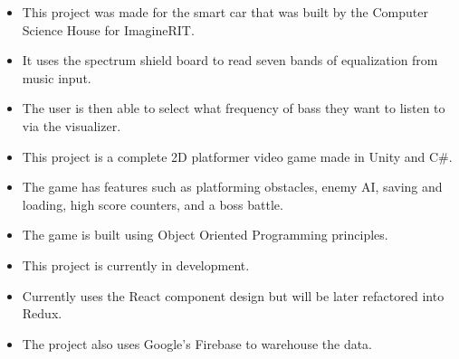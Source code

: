 \documentclass[10pt,a4paper,ragged2e]{altacv}
\begin{document}
\bigskip

\begin{itemize}
\item This project was made for the smart car that was built by the Computer Science House for ImagineRIT.
\item It uses the spectrum shield board to read seven bands of equalization from music input.
\item The user is then able to select what frequency of bass they want to listen to via the visualizer.
\end{itemize}
\divider

\begin{itemize}
\item This project is a complete 2D platformer video game made in Unity and C\#.
\item The game has features such as platforming obstacles, enemy AI, saving and loading, high score counters, and a boss battle.
\item The game is built using Object Oriented Programming principles.
\end{itemize}
\divider

\begin{itemize}
    \item This project is currently in development.
    \item Currently uses the React component design but will be later refactored into Redux.
    \item The project also uses Google's Firebase to warehouse the data.
\end{itemize}




\end{document}
